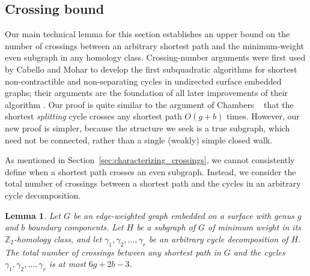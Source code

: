 \documentclass[11pt,twoside]{article}
\def\Z{\mathbb{Z}}
\newtheorem{lemma}[theorem]{Lemma}
\begin{document}
\subsection{Crossing bound}
\label{SS:homotopy-crossing}

Our main technical lemma for this section establishes an upper bound on the number of crossings between an arbitrary shortest path and the minimum-weight even subgraph in any homology class.  Crossing-number arguments were first used by Cabello and Mohar \cite{cm-fsnsn-07} to develop the first subquadratic algorithms for shortest non-contractible and non-separating cycles in undirected surface embedded graphs; their arguments are the foundation of all later improvements of their algorithm \cite{c-mdpg-06, k-csnco-06, cce-msspe-13}.  Our proof is quite similar to the argument of Chambers \etal~\cite{ccelw-scsih-08} that the shortest \emph{splitting} cycle crosses any shortest path $O(g+b)$ times.  However, our new proof is simpler, because the structure we seek is a true subgraph, which need not be connected, rather than a single (weakly) simple closed walk.

As mentioned in Section~\ref{sec:characterizing_crossings}, we cannot consistently define when a shortest path crosses an even subgraph.  Instead, we consider the total number of crossings between a shortest path and the cycles in an arbitrary cycle decomposition.

\begin{lemma}
\label{lem:crossing}
Let $G$ be an edge-weighted graph embedded on a surface with genus $g$ and $b$ boundary components.  Let $H$ be a subgraph of $G$ of minimum weight in its $\Z_2$-homology class, and let $\gamma_1, \gamma_2, \dots, \gamma_r$ be an arbitrary cycle decomposition of $H$.  The total number of crossings between any shortest path in $G$ and the cycles $\gamma_1, \gamma_2, \dots, \gamma_r$ is at most $6g+2b-3$.
\end{lemma}
\end{document}

